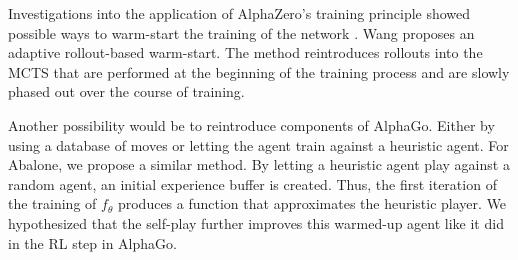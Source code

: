 Investigations into the application of AlphaZero's training principle showed possible ways to warm-start the training of the network \cite{wang_adaptive_2021}. Wang proposes an adaptive rollout-based warm-start. The method reintroduces rollouts into the MCTS that are performed at the beginning of the training process and are slowly phased out over the course of training.

Another possibility would be to reintroduce components of AlphaGo. Either by using a database of moves or letting the agent train against a heuristic agent. For Abalone, we propose a similar method. By letting a heuristic agent play against a random agent, an initial experience buffer is created. Thus, the first iteration of the training of $f_{\theta}$ produces a function that approximates the heuristic player. We hypothesized that the self-play further improves this warmed-up agent like it did in the RL step in AlphaGo.
